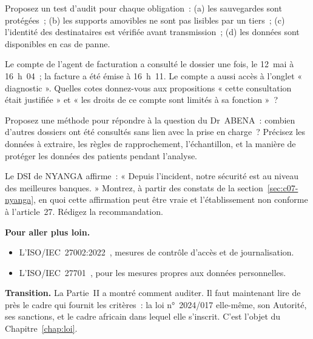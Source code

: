 \begin{boxexo}[title={\ding{45}\quad Exercice~12.1. Quel contrôle \niveaubase}]
Proposez un test d'audit pour chaque obligation~: (a) les sauvegardes sont
protégées~; (b) les supports amovibles ne sont pas lisibles par un tiers~;
(c) l'identité des destinataires est vérifiée avant transmission~;
(d) les données sont disponibles en cas de panne.
\end{boxexo}

\begin{boxexo}[title={\ding{45}\quad Exercice~12.2. Lire un journal \niveaumoyen}]
Le compte de l'agent de facturation a consulté le dossier une fois, le
12~mai à 16~h~04~; la facture a été émise à 16~h~11. Le compte a aussi accès
à l'onglet « diagnostic ». Quelles cotes donnez-vous aux propositions
« cette consultation était justifiée » et « les droits de ce compte sont
limités à sa fonction »~?
\end{boxexo}

\begin{boxexo}[title={\ding{45}\quad Exercice~12.3. Combien d'autres dossiers \niveaumoyen}]
Proposez une méthode pour répondre à la question du Dr~ABENA~: combien
d'autres dossiers ont été consultés sans lien avec la prise en charge~?
Précisez les données à extraire, les règles de rapprochement, l'échantillon,
et la manière de protéger les données des patients pendant l'analyse.
\end{boxexo}

\begin{boxexo}[title={\ding{45}\quad Exercice~12.4. Sécurisé mais non conforme \niveauexpert}]
Le DSI de NYANGA affirme~: « Depuis l'incident, notre sécurité est au
niveau des meilleures banques. » Montrez, à partir des constats de la
section~\ref{sec:c07-nyanga}, en quoi cette affirmation peut être vraie et
l'établissement non conforme à l'article~27. Rédigez la recommandation.
\end{boxexo}

\bigskip

\begin{boxinfo}
\textbf{Pour aller plus loin.}
\begin{itemize}
    \item L'ISO/IEC~27002:2022~\cite{iso27002_2022}, mesures de contrôle
          d'accès et de journalisation.
    \item L'ISO/IEC~27701~\cite{iso27701}, pour les mesures propres aux
          données personnelles.
\end{itemize}
\end{boxinfo}

\begin{boxinfo}
\textbf{Transition.} La Partie~II a montré comment auditer. Il faut
maintenant lire de près le cadre qui fournit les critères~: la loi
n°~2024/017 elle-même, son Autorité, ses sanctions, et le cadre africain
dans lequel elle s'inscrit. C'est l'objet du Chapitre~\ref{chap:loi}.
\end{boxinfo}
